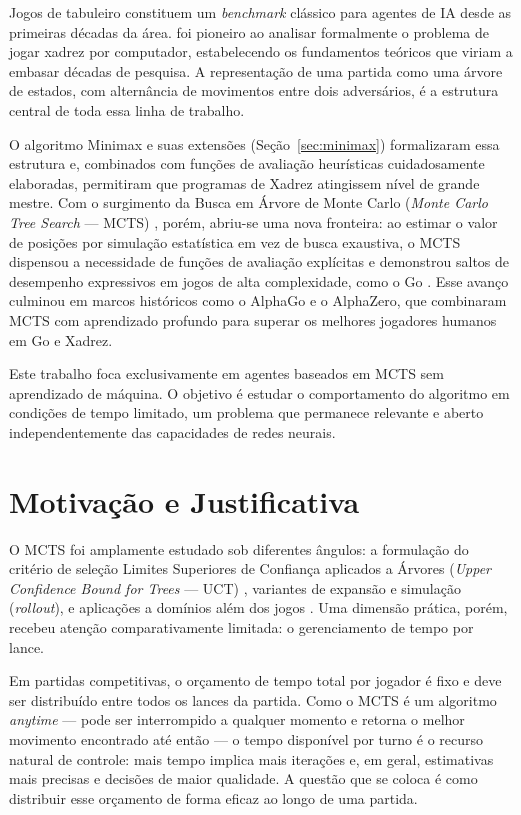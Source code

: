 \documentclass[cic,tc]{iiufrgs}
\begin{document}
Jogos de tabuleiro constituem um \textit{benchmark} clássico para agentes de IA desde as primeiras décadas da área. \citet{shannon1950programming} foi pioneiro ao analisar formalmente o problema de jogar xadrez por computador, estabelecendo os fundamentos teóricos que viriam a embasar décadas de pesquisa. A representação de uma partida como uma árvore de estados, com alternância de movimentos entre dois adversários, é a estrutura central de toda essa linha de trabalho.

O algoritmo Minimax \cite{russell2016artificial} e suas extensões (Seção~\ref{sec:minimax}) formalizaram essa estrutura e, combinados com funções de avaliação heurísticas cuidadosamente elaboradas, permitiram que programas de Xadrez atingissem nível de grande mestre. Com o surgimento da Busca em Árvore de Monte Carlo (\textit{Monte Carlo Tree Search} --- MCTS) \cite{coulom2006efficient,kocsis2006bandit}, porém, abriu-se uma nova fronteira: ao estimar o valor de posições por simulação estatística em vez de busca exaustiva, o MCTS dispensou a necessidade de funções de avaliação explícitas e demonstrou saltos de desempenho expressivos em jogos de alta complexidade, como o Go \cite{gelly2006modification}. Esse avanço culminou em marcos históricos como o AlphaGo e o AlphaZero, que combinaram MCTS com aprendizado profundo para superar os melhores jogadores humanos em Go e Xadrez.

Este trabalho foca exclusivamente em agentes baseados em MCTS sem aprendizado de máquina. O objetivo é estudar o comportamento do algoritmo em condições de tempo limitado, um problema que permanece relevante e aberto independentemente das capacidades de redes neurais.

\section{Motivação e Justificativa}
\label{sec:motivation}

O MCTS foi amplamente estudado sob diferentes ângulos: a formulação do critério de seleção Limites Superiores de Confiança aplicados a Árvores (\emph{Upper Confidence Bound for Trees} --- UCT) \cite{kocsis2006bandit}, variantes de expansão e simulação (\emph{rollout}), e aplicações a domínios além dos jogos \cite{browne2012survey}. Uma dimensão prática, porém, recebeu atenção comparativamente limitada: o gerenciamento de tempo por lance.

Em partidas competitivas, o orçamento de tempo total por jogador é fixo e deve ser distribuído entre todos os lances da partida. Como o MCTS é um algoritmo \emph{anytime} — pode ser interrompido a qualquer momento e retorna o melhor movimento encontrado até então — o tempo disponível por turno é o recurso natural de controle: mais tempo implica mais iterações e, em geral, estimativas mais precisas e decisões de maior qualidade. A questão que se coloca é como distribuir esse orçamento de forma eficaz ao longo de uma partida.
\end{document}
